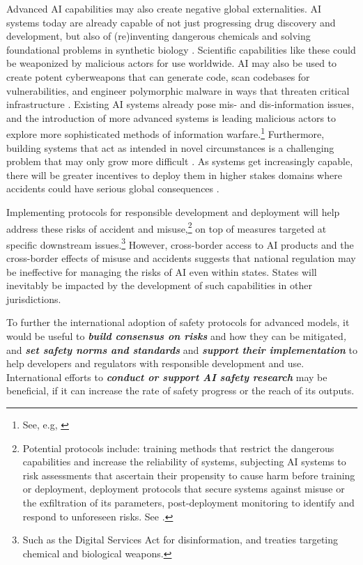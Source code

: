 \documentclass[12pt]{article}
\begin{document}
Advanced AI capabilities may also create negative global externalities.
AI systems today are already capable of not just progressing drug
discovery and development, but also of (re)inventing dangerous
chemicals \cite{urbina_dual_2022} and solving foundational problems in synthetic biology \cite{jumper_highly_2021}.
Scientific capabilities like these could be weaponized by malicious
actors for use worldwide.
AI may also be used to create potent cyberweapons that can generate
code, scan codebases for vulnerabilities,
and engineer polymorphic malware in ways that threaten critical
infrastructure \cite{steinhart_what_2023, shimony_chatting_2023}.
Existing AI systems already pose mis- and dis-information issues, and
the introduction of more advanced systems is leading malicious actors to
explore more sophisticated methods of information warfare.\footnote{See, e.g,
  \cite{bond_fake_2023, goldstein_generative_2023}}
Furthermore, building systems that act as intended in novel
circumstances is a challenging problem that may only grow more
difficult \cite{hendrycks_unsolved_2022, amodei_concrete_2016}.
As systems get increasingly capable, there will be greater incentives to
deploy them in higher stakes domains where accidents could have serious
global consequences \cite{arnold_ai_2021, noauthor_statement_2023}.

Implementing protocols for responsible development and deployment will
help address these risks of accident and misuse,\footnote{Potential
  protocols include: training methods that restrict the dangerous
  capabilities and increase the reliability of systems, subjecting AI
  systems to risk assessments that ascertain their propensity to cause
  harm before training or deployment, deployment protocols that secure
  systems against misuse or the exfiltration of its parameters,
  post-deployment monitoring to identify and respond to unforeseen
  risks. See \cite{anderljung_frontier_2023}.} on top of measures
targeted at specific downstream issues.\footnote{Such as the Digital
  Services Act for disinformation, and treaties targeting chemical and
  biological weapons.} However, cross-border access to AI products and
the cross-border effects of misuse and accidents suggests that national
regulation may be ineffective for managing the risks of AI even within
states. States will inevitably be impacted by the development of such
capabilities in other jurisdictions.

To further the international adoption of safety protocols for advanced models, it would be
useful to \emph{\textbf{build consensus on risks}} and how they can be
mitigated\emph{,} and \emph{\textbf{set safety norms and standards}} and
\emph{\textbf{support their implementation}} to help developers and
regulators with responsible development and use. International efforts
to \emph{\textbf{conduct or support AI safety research}} may be
beneficial, if it can increase the rate of safety progress or the reach
of its outputs.
\end{document}
